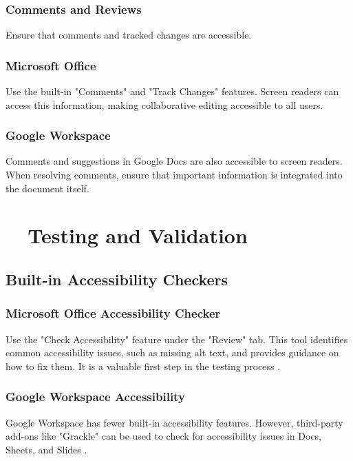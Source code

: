 \subsubsection{Comments and Reviews}\label{ch15:sssec:comments-reviews}
Ensure that comments and tracked changes are accessible.

\subsubsection{Microsoft Office}\label{ch15:sssec:office-comments}
Use the built-in "Comments" and "Track Changes" features. Screen readers can access this information, making collaborative editing accessible to all users.

\subsubsection{Google Workspace}\label{ch15:sssec:google-comments}
Comments and suggestions in Google Docs are also accessible to screen readers. When resolving comments, ensure that important information is integrated into the document itself.

\section{~~Testing and Validation}\label{ch15:sec:testing-validation}

\subsection{Built-in Accessibility Checkers}\label{ch15:ssec:a11y-checkers}

\subsubsection{Microsoft Office Accessibility Checker}\label{ch15:sssec:office-a11y-checker}
Use the "Check Accessibility" feature under the "Review" tab. This tool identifies common accessibility issues, such as missing alt text, and provides guidance on how to fix them. It is a valuable first step in the testing process \supercite{MicrosoftAccessibility}.

\subsubsection{Google Workspace Accessibility}\label{ch15:sssec:google-a11y-checker}
Google Workspace has fewer built-in accessibility features. However, third-party add-ons like "Grackle" can be used to check for accessibility issues in Docs, Sheets, and Slides \supercite{GrackleDocs}.

